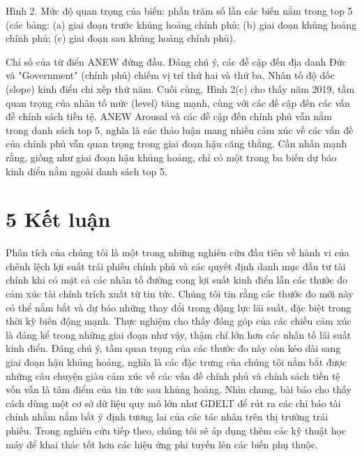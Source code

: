 Hình 2. Mức độ quan trọng của biến: phần trăm số lần các biến nằm trong top 5 (các bảng: (a) giai đoạn trước khủng hoảng chính phủ; (b) giai đoạn khủng hoảng chính phủ; (c) giai đoạn sau khủng hoảng chính phủ).

Chỉ số của từ điển ANEW đứng đầu. Đáng chú ý, các đề cập đến địa danh Đức và "Government" (chính phủ) chiếm vị trí thứ hai và thứ ba. Nhân tố độ dốc (slope) kinh điển chỉ xếp thứ năm. Cuối cùng, Hình 2(c) cho thấy năm 2019, tầm quan trọng của nhân tố mức (level) tăng mạnh, cùng với các đề cập đến các vấn đề chính sách tiền tệ. ANEW Arousal và các đề cập đến chính phủ vẫn nằm trong danh sách top 5, nghĩa là các thảo luận mang nhiều cảm xúc về các vấn đề của chính phủ vẫn quan trọng trong giai đoạn hậu căng thẳng. Cần nhấn mạnh rằng, giống như giai đoạn hậu khủng hoảng, chỉ có một trong ba biến dự báo kinh điển nằm ngoài danh sách top 5.

\section{5 Kết luận}

Phân tích của chúng tôi là một trong những nghiên cứu đầu tiên về hành vi của chênh lệch lợi suất trái phiếu chính phủ và các quyết định danh mục đầu tư tài chính khi có mặt cả các nhân tố đường cong lợi suất kinh điển lẫn các thước đo cảm xúc tài chính trích xuất từ tin tức. Chúng tôi tin rằng các thước đo mới này có thể nắm bắt và dự báo những thay đổi trong động lực lãi suất, đặc biệt trong thời kỳ biến động mạnh. Thực nghiệm cho thấy đóng góp của các chiều cảm xúc là đáng kể trong những giai đoạn như vậy, thậm chí lớn hơn các nhân tố lãi suất kinh điển. Đáng chú ý, tầm quan trọng của các thước đo này còn kéo dài sang giai đoạn hậu khủng hoảng, nghĩa là các đặc trưng của chúng tôi nắm bắt được những câu chuyện giàu cảm xúc về các vấn đề chính phủ và chính sách tiền tệ vốn vẫn là tâm điểm của tin tức sau khủng hoảng. Nhìn chung, bài báo cho thấy cách dùng một cơ sở dữ liệu quy mô lớn như GDELT để rút ra các chỉ báo tài chính nhằm nắm bắt ý định tương lai của các tác nhân trên thị trường trái phiếu. Trong nghiên cứu tiếp theo, chúng tôi sẽ áp dụng thêm các kỹ thuật học máy để khai thác tốt hơn các hiệu ứng phi tuyến lên các biến phụ thuộc.
